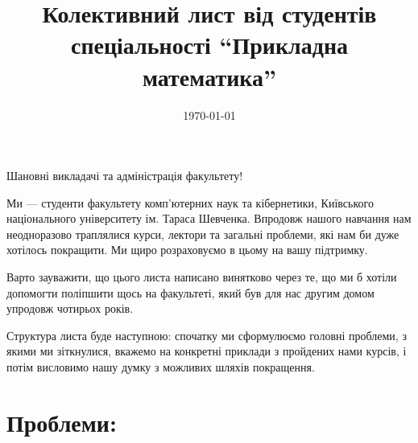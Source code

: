 \documentclass[14pt, a4paper]{extarticle}  %
\title{Колективний лист від студентів спеціальності ``Прикладна математика''}
\date{\today}
\begin{document}
\maketitle

Шановні викладачі та адміністрація факультету!

Ми --- студенти факультету комп'ютерних наук та кібернетики, Київського національного університету ім. Тараса Шевченка. Впродовж нашого навчання нам неодноразово траплялися курси, лектори та загальні проблеми, які нам би дуже хотілось покращити. Ми щиро розраховуємо в цьому на вашу підтримку. 

Варто зауважити, що цього листа написано винятково через те, що ми б хотіли допомогти поліпшити щось на факультеті, який був для нас другим домом упродовж чотирьох років.

Структура листа буде наступною: спочатку ми сформулюємо головні проблеми, з якими ми зіткнулися, вкажемо на конкретні приклади з пройдених нами курсів, і потім висловимо нашу думку з можливих шляхів покращення. 

\section{Проблеми:}
\end{document}
